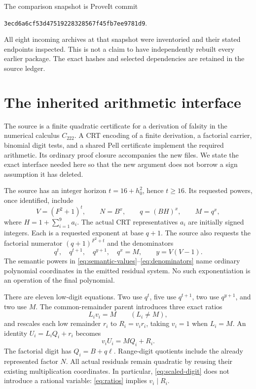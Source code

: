 \documentclass[11pt,letterpaper]{article}
\theoremstyle{remark}\newtheorem{remark}[theorem]{Remark}
\begin{document}
The comparison snapshot is ProveIt commit
\begin{center}\small\texttt{3ecd6a6cf53d47519228328567f45fb7ee9781d9}.\end{center}
All eight incoming archives at that snapshot were inventoried and their stated endpoints inspected. This is not a claim to have independently rebuilt every earlier package. The exact hashes and selected dependencies are retained in the source ledger.

\section{The inherited arithmetic interface}
\label{sec:interface}
The source is a finite quadratic certificate for a derivation of falsity in the numerical calculus $C_{222}$. A CRT encoding of a finite derivation, a factorial carrier, binomial digit tests, and a shared Pell certificate implement the required arithmetic. Its ordinary proof closure accompanies the new files. We state the exact interface needed here so that the new argument does not borrow a sign assumption it has deleted.

The source has an integer horizon $t=16+h_0^2$, hence $t\ge16$. Its requested powers, once identified, include
\begin{equation}\label{eq:semantic-values}
 V=(F^2+1)^t,\qquad N=B^x,\qquad q=(BH)^x,\qquad M=q^x,
\end{equation}
where $H=1+\sum_{i=1}^{9}a_i$. The actual CRT representatives $a_i$ are initially signed integers. Each is a requested exponent at base $q+1$. The source also requests the factorial numerator $(q+1)^{F^2+t}$ and the denominators
\begin{equation}\label{eq:denominators}
 q^t,\quad q^{t+1},\quad q^{y+1},\quad q^x=M,
 \qquad y=V(V-1).
\end{equation}
The semantic powers in \eqref{eq:semantic-values}--\eqref{eq:denominators} name ordinary polynomial coordinates in the emitted residual system. No such exponentiation is an operation of the final polynomial.

There are eleven low-digit equations. Two use $q^t$, five use $q^{t+1}$, two use $q^{y+1}$, and two use $M$. The common-remainder parent introduces three exact ratios
\begin{equation}\label{eq:ratios}
 L_i v_i=M\qquad(L_i\ne M),
\end{equation}
and rescales each low remainder $r_i$ to $R_i=v_i r_i$, taking $v_i=1$ when $L_i=M$. An identity $U_i=L_i Q_i+r_i$ becomes
\begin{equation}\label{eq:scaled-digit}
 v_iU_i=MQ_i+R_i.
\end{equation}
The factorial digit has $Q_i=B+q\ell$. Range-digit quotients include the already represented factor $N$. All actual residuals remain quadratic by reusing their existing multiplication coordinates. In particular, \eqref{eq:scaled-digit} does not introduce a rational variable: \eqref{eq:ratios} implies $v_i\mid R_i$.
\end{document}
